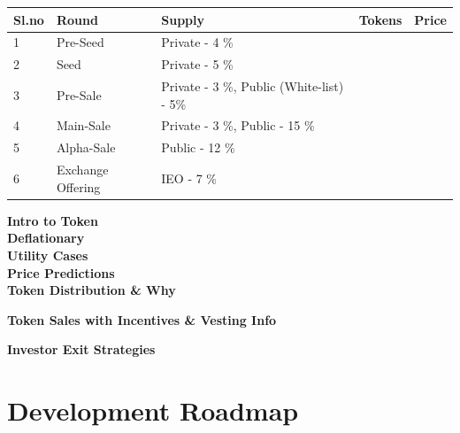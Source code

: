 \documentclass[letterpaper,11pt]{article}
\begin{document}
\begin{center}
\begin{table}[!ht]
    \centering
    \begin{tabular}{|l|l|l|l|l|}
    \hline
        \textbf{Sl.no} & \textbf{Round} & \textbf{Supply} & \textbf{Tokens} & \textbf{Price} \\ \hline
        1 & Pre-Seed & Private - 4 \% &  & ~ \\ \hline
        2 & Seed & Private - 5 \% &  & ~ \\ \hline
        3 & Pre-Sale & Private - 3 \%,  Public (White-list) - 5\%  &  & ~ \\ \hline
        4 & Main-Sale & Private -  3 \%, Public - 15 \% &  & ~ \\ \hline
        5 & Alpha-Sale & Public - 12 \% &  & ~ \\ \hline
        6 & Exchange Offering & IEO - 7 \% &  & ~ \\ \hline
    \end{tabular}
\end{table}
\end{center}

\textbf{Intro to Token}\\


\textbf{Deflationary}\\


\textbf{Utility Cases}\\


\textbf{Price Predictions}\\


\textbf{Token Distribution \& Why}


\textbf{Token Sales with Incentives \& Vesting Info}


\textbf{Investor Exit Strategies}

\section{\textbf{Development Roadmap}}
\end{document}

